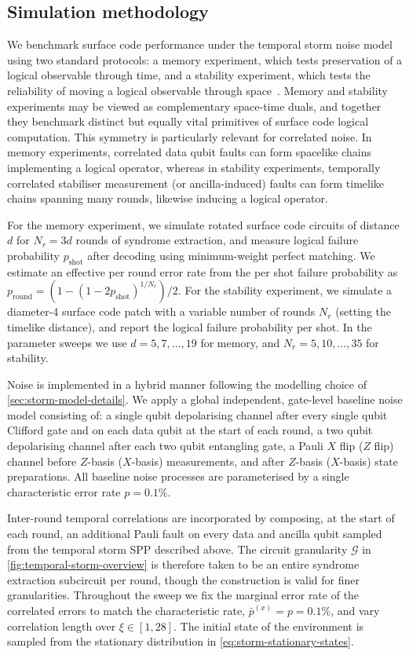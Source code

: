 \subsection{Simulation methodology}
We benchmark surface code performance under the temporal storm noise model using two standard protocols: a memory experiment, which tests preservation of a logical observable through time, and a stability experiment, which tests the reliability of moving a logical observable through space~\cite{gidneyStabilityExperimentsOverlooked2022}. Memory and stability experiments may be viewed as complementary space-time duals, and together they benchmark distinct but equally vital primitives of surface code logical computation. This symmetry is particularly relevant for correlated noise. In memory experiments, correlated data qubit faults can form spacelike chains implementing a logical operator, whereas in stability experiments, temporally correlated stabiliser measurement (or ancilla-induced) faults can form timelike chains spanning many rounds, likewise inducing a logical operator.

For the memory experiment, we simulate rotated surface code circuits of distance \(d\) for \(N_r = 3d\) rounds of syndrome extraction, and measure logical failure probability \(p_\mathrm{shot}\) after decoding using minimum-weight perfect matching. We estimate an effective per round error rate from the per shot failure probability as \(p_\mathrm{round} = (1 - (1 - 2p_\mathrm{shot})^{1/N_r})/2\). For the stability experiment, we simulate a diameter-4 surface code patch with a variable number of rounds \(N_r\) (setting the timelike distance), and report the logical failure probability per shot. In the parameter sweeps we use \(d = 5, 7, \dots, 19\) for memory, and \(N_r = 5, 10, \dots, 35\) for stability.

Noise is implemented in a hybrid manner following the modelling choice of \cref{sec:storm-model-details}. We apply a global independent, gate-level baseline noise model consisting of: a single qubit depolarising channel after every single qubit Clifford gate and on each data qubit at the start of each round, a two qubit depolarising channel after each two qubit entangling gate, a Pauli \(X\) flip (\(Z\) flip) channel before \(Z\)-basis (\(X\)-basis) measurements, and after \(Z\)-basis (\(X\)-basis) state preparations. All baseline noise processes are parameterised by a single characteristic error rate \(p = 0.1\%\).

Inter-round temporal correlations are incorporated by composing, at the start of each round, an additional Pauli fault on every data and ancilla qubit sampled from the temporal storm SPP described above. The circuit granularity \(\mathcal{G}\) in \cref{fig:temporal-storm-overview} is therefore taken to be an entire syndrome extraction subcircuit per round, though the construction is valid for finer granularities. Throughout the sweep we fix the marginal error rate of the correlated errors to match the characteristic rate, \(\bar{p}^{(x)} = p = 0.1\%\), and vary correlation length over \(\xi \in [1, 28]\). The initial state of the environment is sampled from the stationary distribution in \cref{eq:storm-stationary-states}.

